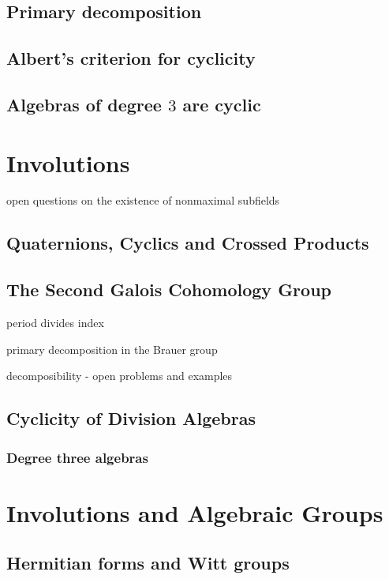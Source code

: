 \documentclass[12pt]{report}
\theoremstyle{plain}
\newcommand{\todo}[1]{\textcolor{todo}{#1}}
\begin{document}
\section{Primary decomposition}

\section{Albert's criterion for cyclicity}

\section{Algebras of degree $3$ are cyclic}

\chapter{Involutions}
\iffalse

\todo{open questions on the existence of nonmaximal subfields}

\section{Quaternions, Cyclics and Crossed Products}

\section{The Second Galois Cohomology Group}

\todo{period divides index}

\todo{primary decomposition in the Brauer group}

\todo{decomposibility - open problems and examples}

\section{Cyclicity of Division Algebras}

\subsection{Degree three algebras}


\chapter{Involutions and Algebraic Groups}

\section{Hermitian forms and Witt groups}
\end{document}
